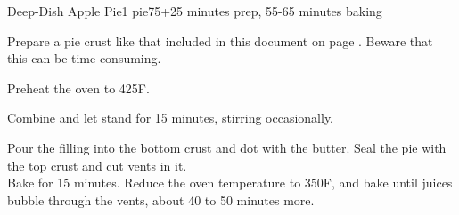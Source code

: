 \documentclass[../Cookbook.tex]{subfiles}
\begin{document}
\begin{recipe}{Deep-Dish Apple Pie}{1 pie}{75+25 minutes prep, 55-65 minutes baking}

	Prepare a pie crust like that included in this document on page \pageref{PieCrust}. Beware that this can be time-consuming.

	\newstep
	Preheat the oven to 425\0F.

	Combine and let stand for 15 minutes, stirring occasionally.

	Pour the filling into the bottom crust and dot with the butter. Seal the pie with the top crust and cut vents in it.\\
	Bake for 15 minutes.
	Reduce the oven temperature to 350\0F, and bake until juices bubble through the vents, about 40 to 50 minutes more.

\end{recipe}
\end{document}
